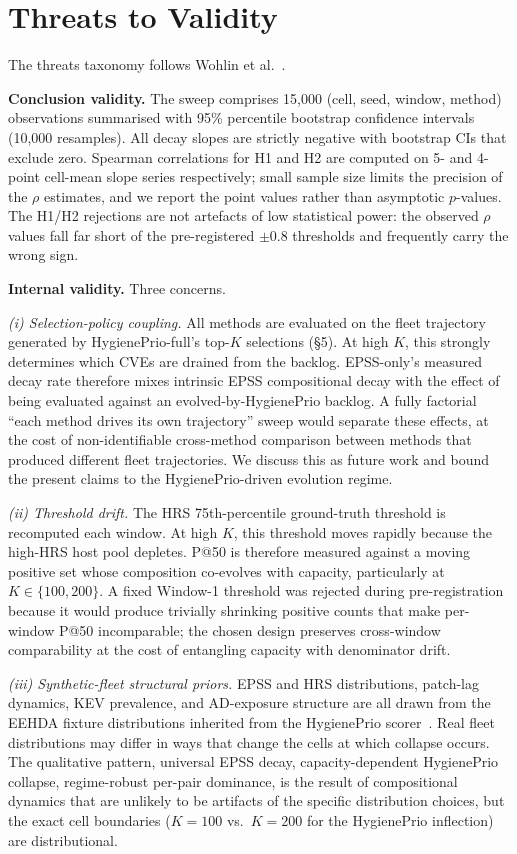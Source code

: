 \section{Threats to Validity}
\label{sec:threats}

The threats taxonomy follows Wohlin et al.~\cite{wohlin2012experimentation}.

\textbf{Conclusion validity.} The sweep comprises 15{,}000 (cell, seed,
window, method) observations summarised with 95\% percentile bootstrap
confidence intervals (10{,}000 resamples). All decay slopes are
strictly negative with bootstrap CIs that exclude zero. Spearman
correlations for H1 and H2 are computed on 5- and 4-point cell-mean
slope series respectively; small sample size limits the precision of
the $\rho$ estimates, and we report the point values rather than asymptotic
$p$-values. The H1/H2 rejections are not artefacts of low statistical
power: the observed $\rho$ values fall far short of the pre-registered
$\pm 0.8$ thresholds and frequently carry the wrong sign.

\textbf{Internal validity.} Three concerns.

\textit{(i) Selection-policy coupling.} All methods are evaluated on
the fleet trajectory generated by HygienePrio-full's top-$K$ selections
(\S5). At high $K$, this strongly determines which CVEs are drained
from the backlog. EPSS-only's measured decay rate therefore mixes
intrinsic EPSS compositional decay with the effect of being evaluated
against an evolved-by-HygienePrio backlog. A fully factorial
``each method drives its own trajectory'' sweep would separate these
effects, at the cost of non-identifiable cross-method comparison
between methods that produced different fleet trajectories. We discuss
this as future work and bound the present claims to the
HygienePrio-driven evolution regime.

\textit{(ii) Threshold drift.} The HRS 75th-percentile ground-truth
threshold is recomputed each window. At high $K$, this threshold
moves rapidly because the high-HRS host pool depletes. P@50 is
therefore measured against a moving positive set whose composition
co-evolves with capacity, particularly at $K \in \{100, 200\}$. A
fixed Window-1 threshold was rejected during pre-registration because
it would produce trivially shrinking positive counts that make
per-window P@50 incomparable; the chosen design preserves cross-window
comparability at the cost of entangling capacity with denominator drift.

\textit{(iii) Synthetic-fleet structural priors.} EPSS and HRS
distributions, patch-lag dynamics, KEV prevalence, and AD-exposure
structure are all drawn from the EEHDA fixture distributions inherited
from the HygienePrio scorer~\cite{paper4hygieneprio}. Real fleet distributions
may differ in ways that change the cells at which collapse occurs.
The qualitative pattern, universal EPSS decay, capacity-dependent
HygienePrio collapse, regime-robust per-pair dominance, is the
result of compositional dynamics that are unlikely to be artifacts of
the specific distribution choices, but the exact cell boundaries
($K = 100$ vs.\ $K = 200$ for the HygienePrio inflection) are
distributional.

